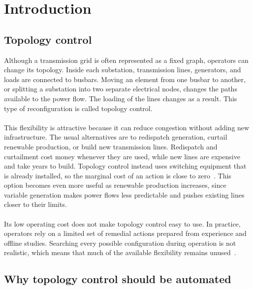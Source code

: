 \chapter{Introduction}
\label{ch:introduction}

\section{Topology control}
\label{sec:intro-topology-control}

Although a transmission grid is often represented as a fixed graph, operators
can change its topology. Inside each substation, transmission lines, generators,
and loads are connected to busbars. Moving an element from one
busbar to another, or splitting a substation into two separate electrical nodes,
changes the paths available to the power flow. The loading of the lines changes
as a result. This type of reconfiguration is called topology control.
\\
\\
This flexibility is attractive because it can reduce congestion without adding
new infrastructure. The usual alternatives are to redispatch generation,
curtail renewable production, or build new transmission lines. Redispatch and
curtailment cost money whenever they are used, while new lines are expensive
and take years to build. Topology control instead uses switching equipment that
is already installed, so the marginal cost of an action is close to
zero~\cite{fisher2008ots}. This option becomes even more useful as renewable
production increases, since variable generation makes power flows less
predictable and pushes existing lines closer to their limits.
\\
\\
Its low operating cost does not make topology control easy to use. In practice,
operators rely on a limited set of remedial actions prepared from experience and
offline studies. Searching every possible configuration during operation is not
realistic, which means that much of the available flexibility remains
unused~\cite{viebahn2022ai}.

\section{Why topology control should be automated}
\label{sec:intro-automation}

